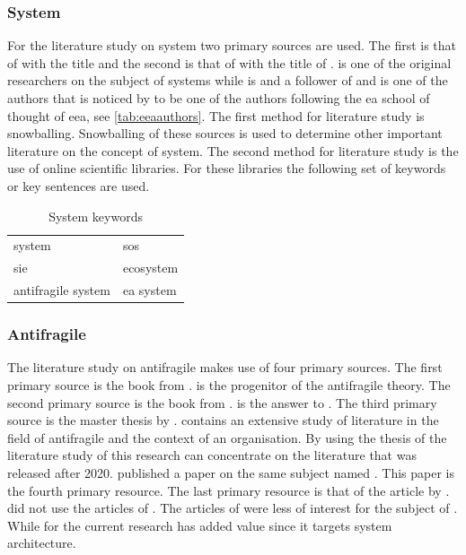 \subsubsection{System}
\label{subsub:system}
For the literature study on system two primary sources are used. The first is that of \textcite{Ackoff1973} with the title  and the second is that of \textcite{Gharajedaghi2011} with the title of . \citeauthor{Ackoff1973} is one of the original researchers on the subject of systems while \citeauthor{Gharajedaghi2011} is and a follower of \citeauthor{Ackoff1973} and is one of the authors that is noticed by \textcite[p.~42]{Lapalme2012} to be one of the authors following the \acrshort{ea} school of thought of \acrshort{eea}, see \cref{tab:eeaauthors}. The first method for literature study is snowballing. Snowballing of these sources is used to determine other important literature on the concept of system. The second method for literature study is the use of online scientific libraries. For these libraries the following set of keywords or key sentences are used.
\begin{table}[H]
	\centering
	\begin{tabular}{p{}p{}}
		\toprule
		system & \acrlong{sos} \\%
		\acrlong{sie} & ecosystem \\%
		\gls{antifragile} system & \acrlong{ea} system \\%
		\bottomrule
	\end{tabular}
	\caption[System keywords]{System keywords}
	\label{tab:systemkeywords}
\end{table}
\subsubsection{Antifragile}
\label{subsub:antifragile}
The literature study on \gls{antifragile} makes use of four primary sources. The first primary source is the book  from \citeauthor{Taleb2012}. \citeauthor{Taleb2012} is the progenitor of the \gls{antifragile} theory. The second primary source is the book  from \citeauthor{Taleb2008}.  is the answer to . The third primary source is the master thesis  by \citeauthor{Botjes2020}. \textcite{Botjes2020} contains an extensive study of literature in the field of \gls{antifragile} and the context of an organisation. By using the thesis of \citeauthor{Botjes2020} the literature study of this research can concentrate on the literature that was released after 2020. \citeauthor{Botjes2021} published a paper on the same subject named . This paper is the fourth primary resource. The last primary resource is that of the article  by \textcite{OReilly2019}. \textcite{Botjes2020} did not use the articles of \citeauthor{OReilly2019}. The articles of \citeauthor{OReilly2019} were less of interest for the subject of \citeauthor{Botjes2020}. While for the current research \textcite{OReilly2019} has added value since it targets system architecture.

